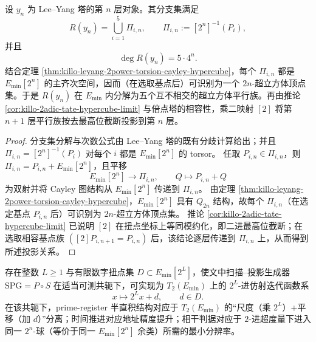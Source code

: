 \begin{proposition}\label{prop:killo-leyang-branchset-hypercube-families}
设 \(y_n\) 为 Lee--Yang 塔的第 \(n\) 层对象。其分支集满足
\[
R(y_n)=\bigcup_{i=1}^{5}\Pi_{i,n},
\qquad
\Pi_{i,n}:=[2^n]^{-1}(P_i),
\]
并且
\[
\deg R(y_n)=5\cdot 4^n.
\]
结合定理 \ref{thm:killo-leyang-2power-torsion-cayley-hypercube}，每个 \(\Pi_{i,n}\) 都是 \(E_{\min}[2^n]\) 的主齐次空间，因而（在选取基点后）可识别为一个 \(2n\)-超立方体顶点集。于是 \(R(y_n)\) 在 \(E_{\min}\) 内分解为五个互不相交的超立方体平行族。再由推论 \ref{cor:killo-2adic-tate-hypercube-limit} 与倍点塔的相容性，乘二映射 \([2]\) 将第 \(n+1\) 层平行族按去最高位截断投影到第 \(n\) 层。
\end{proposition}
\begin{proof}
分支集分解与次数公式由 Lee--Yang 塔的既有分歧计算给出；并且 \(\Pi_{i,n}=[2^n]^{-1}(P_i)\) 对每个 \(i\) 都是 \(E_{\min}[2^n]\) 的 torsor。
任取 \(P_{i,n}\in\Pi_{i,n}\)，则 \(\Pi_{i,n}=P_{i,n}+E_{\min}[2^n]\)，且平移
\[
E_{\min}[2^n]\to \Pi_{i,n},\qquad Q\mapsto P_{i,n}+Q
\]
为双射并将 Cayley 图结构从 \(E_{\min}[2^n]\) 传递到 \(\Pi_{i,n}\)。
由定理 \ref{thm:killo-leyang-2power-torsion-cayley-hypercube}，\(E_{\min}[2^n]\) 具有 \(Q_{2n}\) 结构，故每个 \(\Pi_{i,n}\)（在选定基点 \(P_{i,n}\) 后）可识别为 \(2n\)-超立方体顶点集。
推论 \ref{cor:killo-2adic-tate-hypercube-limit} 已说明 \([2]\) 在扭点坐标上等同模约化，即二进最高位截断；在选取相容基点族 \(([2]P_{i,n+1}=P_{i,n})\) 后，该结论逐层传递到 \(\Pi_{i,n}\) 上，从而得到所述投影关系。
\end{proof}



\begin{conjecture}\label{conj:killo-godel-leyang-unified-realization}
存在整数 \(L\ge 1\) 与有限数字扭点集 \(D\subset E_{\min}[2^L]\)，使文中扫描--投影生成器 \(\mathrm{SPG}=P\circ S\) 在适当可测共轭下，可实现为 \(T_2(E_{\min})\) 上的 \(2^L\)-进仿射迭代函数系
\[
x\longmapsto 2^Lx+d,\qquad d\in D.
\]
在该共轭下，prime-register 半直积结构对应于 \(T_2(E_{\min})\) 的“尺度（乘 \(2^L\)）+平移（加 \(d\)）”分离；时间推进对应地址精度提升；相干判据对应于 \(2\)-进超度量下进入同一 \(2^n\)-球（等价于同一 \(E_{\min}[2^n]\) 余类）所需的最小分辨率。
\end{conjecture}



